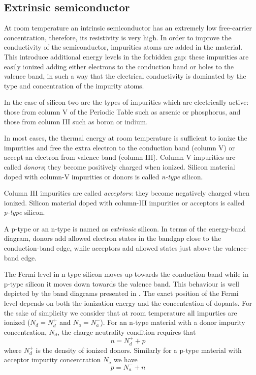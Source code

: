 \subsection{Extrinsic semiconductor}
At room temperature an intrinsic semiconductor has an extremely low free-carrier concentration, therefore, its resistivity is very high. In order to improve the conductivity of the semiconductor, impurities atoms are added in the material. This introduce additional energy levels in the forbidden gap: these impurities are easily ionized adding either electrons to the conduction band or holes to the valence band, in such a way that the electrical conductivity is dominated by the type and concentration of the impurity atoms.

In the case of silicon two are the types of impurities which are electrically active: those from column V of the Periodic Table such as arsenic or phosphorus, and those from column III such as boron or indium.

 In most cases, the thermal energy at room temperature is sufficient to ionize the impurities and free the extra electron to the conduction band (column V) or accept an electron from valence band (column III). Column V impurities are called \textit{donors}; they become positively charged when ionized. Silicon material doped with column-V impurities or donors is called \textit{n-type} silicon.

Column III impurities are called \textit{acceptors}: they become negatively charged when ionized. Silicon material doped with column-III impurities or acceptors is called \textit{p-type} silicon.

A p-type or an n-type is named as \textit{extrinsic} silicon.
In terms of the energy-band diagram, donors add allowed electron states in the bandgap close to the conduction-band edge, while acceptors add allowed states just above the valence-band edge.

The Fermi level in n-type silicon moves up towards the conduction band while in p-type silicon it moves down towards the valence band. This behaviour is well depicted by the band diagrams presented in .
The exact position of the Fermi level depends on both the ionization energy and the concentration of dopants. For the sake of simplicity we consider that at room temperature all impurties are ionized ($N_d = N_d^+$ and $N_a = N_a^-$).  For an n-type material with a donor impurity concentration, $N_d$, the charge neutrality condition requires that
\begin{equation}
\label{eq: equilibrium charge in n-type}
n = N_d^+ + p
\end{equation}
 where $N_d^+$ is the density of ionized donors.  Similarly for a p-type material with acceptor impurity concentration $N_a$ we have
\begin{equation}
\label{eq: equilibrium charge in p-type}
p = N_a^- + n
\end{equation}
 
